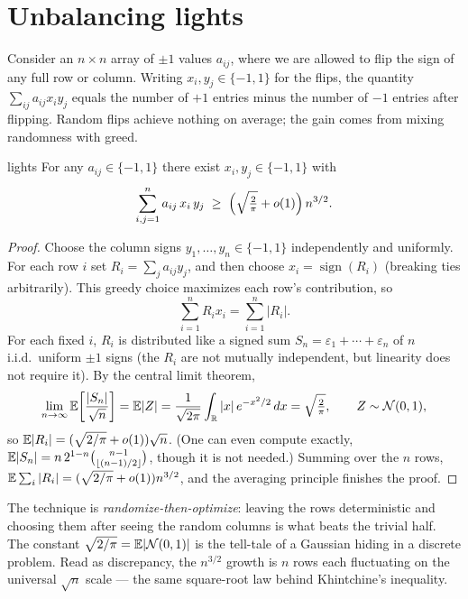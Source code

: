 \section{Unbalancing lights}

Consider an $n\times n$ array of $\pm1$ values $a_{ij}$, where we are allowed
to flip the sign of any full row or column. Writing $x_i,y_j\in\{-1,1\}$ for
the flips, the quantity $\sum_{ij}a_{ij}x_iy_j$ equals the number of
$+1$ entries minus the number of $-1$ entries after flipping. Random flips
achieve nothing on average; the gain comes from mixing randomness with greed.

\begin{theorem}{}{lights}
For any $a_{ij}\in\{-1,1\}$ there exist $x_i,y_j\in\{-1,1\}$ with
\[
  \sum_{i,j=1}^n a_{ij}\,x_i\,y_j
  \;\ge\; \Bigl(\sqrt{\tfrac{2}{\pi}}+o(1)\Bigr)\,n^{3/2}.
\]
\end{theorem}

\begin{proof}
Choose the column signs $y_1,\dots,y_n\in\{-1,1\}$ independently and
uniformly. For each row $i$ set $R_i=\sum_j a_{ij}y_j$, and then choose
$x_i=\operatorname{sign}(R_i)$ (breaking ties arbitrarily). This greedy choice
maximizes each row's contribution, so
\[
  \sum_{i=1}^n R_i x_i = \sum_{i=1}^n |R_i|.
\]
For each fixed $i$, $R_i$ is distributed like a signed sum
$S_n=\varepsilon_1+\cdots+\varepsilon_n$ of $n$ i.i.d.\ uniform $\pm1$ signs
(the $R_i$ are not mutually independent, but linearity does not require it).
By the central limit theorem,
\[
  \lim_{n\to\infty}\mathbb{E}\!\left[\frac{|S_n|}{\sqrt n}\right]
   = \mathbb{E}|Z| = \frac{1}{\sqrt{2\pi}}\int_{\mathbb{R}}|x|\,e^{-x^2/2}\,dx
   = \sqrt{\tfrac{2}{\pi}}, \qquad Z\sim\mathcal N(0,1),
\]
so $\mathbb{E}|R_i|=(\sqrt{2/\pi}+o(1))\sqrt n$. (One can even compute exactly,
$\mathbb{E}|S_n|=n\,2^{1-n}\binom{n-1}{\lfloor (n-1)/2\rfloor}$, though it is not
needed.) Summing over the $n$ rows, $\mathbb{E}\sum_i|R_i|=(\sqrt{2/\pi}+o(1))n^{3/2}$,
and the averaging principle finishes the proof.
\end{proof}

\begin{insight}
The technique is \emph{randomize-then-optimize}: leaving the rows
deterministic and choosing them after seeing the random columns is what beats
the trivial half. The constant $\sqrt{2/\pi}=\mathbb{E}|\mathcal N(0,1)|$ is the
tell-tale of a Gaussian hiding in a discrete problem. Read as discrepancy,
the $n^{3/2}$ growth is $n$ rows each fluctuating on the universal
$\sqrt n$ scale --- the same square-root law behind Khintchine's inequality.
\end{insight}

